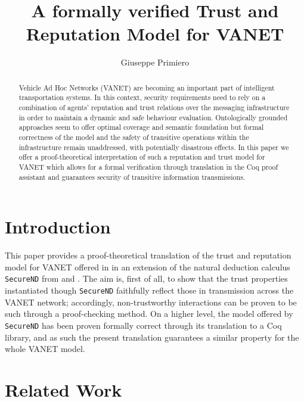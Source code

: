 \documentclass[compsoc, conference, letterpaper, 10pt, times]{IEEEtran}
\begin{document}
\title{A formally verified Trust and Reputation Model for VANET}
\author{Giuseppe Primiero}





\maketitle

\begin{abstract}
Vehicle Ad Hoc Networks (VANET) are becoming an important part of intelligent transportation systems. In this context, security requirements need to rely on a combination of agents' reputation and trust relations over the messaging infrastructure in order to maintain a dynamic and safe behaviour evaluation. Ontologically grounded approaches seem to offer optimal coverage and semantic foundation but formal correctness of the model and the safety of transitive operations within the infrastructure remain unaddressed, with potentially disastrous effects. In this paper we offer a proof-theoretical interpretation of such a reputation and trust model for VANET which allows for a formal verification through translation in the Coq proof assistant and guarantees security of transitive information transmissions.
\end{abstract}


\section{Introduction}\label{sec:intro}

This paper provides a proof-theoretical translation of the trust and reputation model for VANET offered in \cite{xxx} in an extension of the natural deduction calculus \texttt{SecureND} from \cite{yyy} and \cite{zzz}. The aim is, first of all, to show that the trust properties instantiated though \texttt{SecureND} faithfully reflect those in transmission across the VANET network; accordingly, non-trustworthy interactions can be proven to be such through a proof-checking method. On a higher level, the model offered by \texttt{SecureND} has been proven formally correct through its translation to a Coq library, and as such the present translation guarantees a similar property for the whole VANET model.


\section{Related Work}\label{sec:related}
\end{document}
